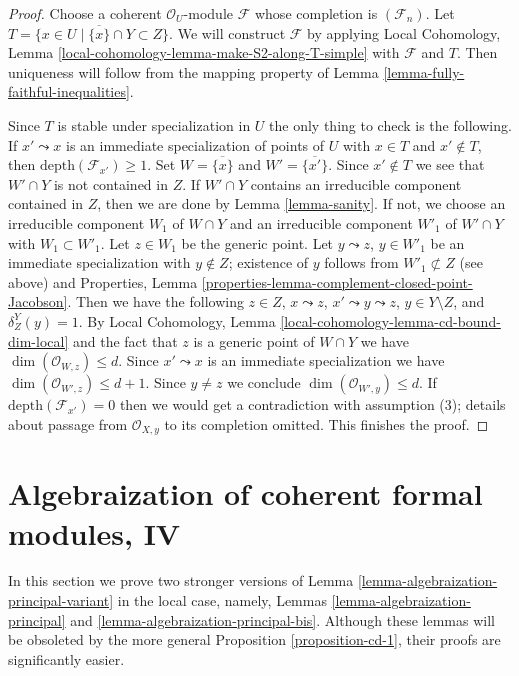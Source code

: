 \documentclass{stacks-project}
\theoremstyle{plain}
\theoremstyle{definition}
\theoremstyle{remark}
\numberwithin{equation}{subsection}
\begin{document}
\begin{proof}
Choose a coherent $\mathcal{O}_U$-module $\mathcal{F}$ whose
completion is $(\mathcal{F}_n)$. Let
$T = \{x \in U \mid \overline{\{x\}} \cap Y \subset Z\}$.
We will construct $\mathcal{F}$ by applying Local Cohomology,
Lemma \ref{local-cohomology-lemma-make-S2-along-T-simple}
with $\mathcal{F}$ and $T$.
Then uniqueness will follow from the mapping property
of Lemma \ref{lemma-fully-faithful-inequalities}.

\medskip\noindent
Since $T$ is stable under specialization in $U$ the only
thing to check is the following. If $x' \leadsto x$ is an
immediate specialization of points of $U$ with $x \in T$
and $x' \not \in T$, then $\text{depth}(\mathcal{F}_{x'}) \geq 1$.
Set $W = \overline{\{x\}}$ and $W' = \overline{\{x'\}}$.
Since $x' \not \in T$ we see that $W' \cap Y$ is not contained in $Z$.
If $W' \cap Y$ contains an irreducible component contained in $Z$,
then we are done by Lemma \ref{lemma-sanity}.
If not, we choose an irreducible component $W_1$ of $W \cap Y$ and
an irreducible component $W'_1$ of $W' \cap Y$ with $W_1 \subset W'_1$.
Let $z \in W_1$ be the generic point. Let $y \leadsto z$, $y \in W'_1$
be an immediate specialization with $y \not \in Z$; existence of $y$
follows from $W'_1 \not \subset Z$ (see above) and
Properties, Lemma \ref{properties-lemma-complement-closed-point-Jacobson}.
Then we have the following $z \in Z$, $x \leadsto z$,
$x' \leadsto y \leadsto z$, $y \in Y \setminus Z$, and $\delta^Y_Z(y) = 1$.
By Local Cohomology, Lemma \ref{local-cohomology-lemma-cd-bound-dim-local}
and the fact that $z$
is a generic point of $W \cap Y$ we have
$\dim(\mathcal{O}_{W, z}) \leq d$.
Since $x' \leadsto x$ is an immediate specialization we have
$\dim(\mathcal{O}_{W', z}) \leq d + 1$.
Since $y \not = z$ we conclude
$\dim(\mathcal{O}_{W', y}) \leq d$.
If $\text{depth}(\mathcal{F}_{x'}) = 0$ then we would get
a contradiction with assumption (3); details about passage
from $\mathcal{O}_{X, y}$ to its completion omitted.
This finishes the proof.
\end{proof}








\section{Algebraization of coherent formal modules, IV}
\label{section-algebraization-modules-local}

\noindent
In this section we prove two stronger versions of
Lemma \ref{lemma-algebraization-principal-variant}
in the local case, namely, Lemmas \ref{lemma-algebraization-principal}
and \ref{lemma-algebraization-principal-bis}.
Although these lemmas will be obsoleted by the more general
Proposition \ref{proposition-cd-1}, their proofs are significantly
easier.
\end{document}
